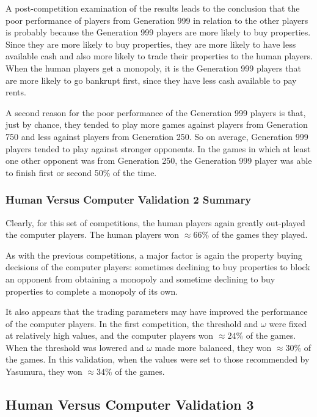 A post-competition examination of the results leads to the conclusion that the
poor performance of players from Generation 999 in relation to the other players
is probably because the Generation 999 players are more likely to buy
properties. Since they are more likely to buy properties, they are more likely
to have less available cash and also more likely to trade their properties to
the human players. When the human players get a monopoly, it is the Generation
999 players that are more likely to go bankrupt first, since they have less cash
available to pay rents.

A second reason for the poor performance of the Generation 999 players is that,
just by chance, they tended to play more games against players from Generation
750 and less against players from Generation 250. So on average, Generation 999
players tended to play against stronger opponents. In the games in which at
least one other opponent was from Generation 250, the Generation 999 player was
able to finish first or second 50\% of the time.

\subsubsection{Human Versus Computer Validation 2 Summary}

Clearly, for this set of competitions, the human players again greatly
out-played the computer players. The human players won \(\approx66\%\) of the
games they played. 

As with the previous competitions, a major factor is again the property buying
decisions of the computer players: sometimes declining to buy properties to
block an opponent from obtaining a monopoly and sometime declining to buy
properties to complete a monopoly of its own.

It also appears that the trading parameters may have improved the performance of
the computer players. In the first competition, the threshold and \(\omega\)
were fixed at relatively high values, and the computer players won
\(\approx24\%\) of the games. When the threshold was lowered and \(\omega\) made
more balanced, they won \(\approx30\%\) of the games. In this validation, when
the values were set to those recommended by Yasumura, they won \(\approx34\%\)
of the games.

\subsection{Human Versus Computer Validation 3} \label{6_humanVRGA3}

